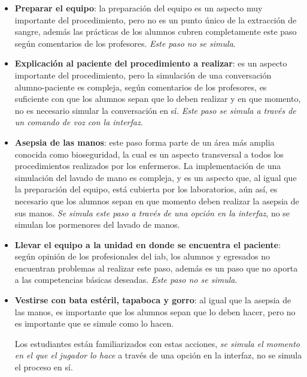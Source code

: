 \begin{itemize}

\item \textbf{Preparar el equipo}: la preparación del equipo es un aspecto muy
    importante del procedimiento, pero no es un punto único de la extracción de
    sangre, además las prácticas de los alumnos cubren completamente este paso
    según comentarios de los profesores. \emph{Este paso no se simula}.

\item \textbf{Explicación al paciente del procedimiento a realizar}: es un
    aspecto importante del procedimiento, pero la simulación de una conversación
    alumno-paciente es compleja, según comentarios de los profesores, es
    suficiente con que los alumnos sepan que lo deben realizar y en que momento,
    no es necesario simular la conversación en sí. \emph{Este paso se simula a
        través de un comando de voz con la interfaz}.

\item \textbf{Asepsia de las manos}: este paso forma parte de un área más amplia
    conocida como bioseguridad, la cual es un aspecto transversal a todos los
    procedimientos realizados por los enfermeros. La implementación de una
    simulación del lavado de mano es compleja, y es un aspecto que, al igual que
    la preparación del equipo, está cubierta por los laboratorios, aún así, es
    necesario que los alumnos sepan en que momento deben realizar la asepsia de
    sus manos. \emph{Se simula este paso a través de una opción en la interfaz},
    no se simulan los pormenores del lavado de manos.

\item \textbf{Llevar el equipo a la unidad en donde se encuentra el paciente}:
    según opinión de los profesionales del \Gls{iab}, los alumnos y egresados no
    encuentran problemas al realizar este paso, además es un paso que no aporta
    a las competencias básicas deseadas. \emph{Este paso no se simula}.

\item \textbf{Vestirse con bata estéril, tapaboca y gorro}: al igual que la
    asepsia de las manos, es importante que los alumnos sepan que lo deben
    hacer, pero no es importante que se simule como lo hacen. 

    Los estudiantes están familiarizados con estas acciones, \emph{se simula el
        momento en el que el jugador lo hace} a través de una opción
    en la interfaz, no se simula el proceso en sí.


\end{itemize}
